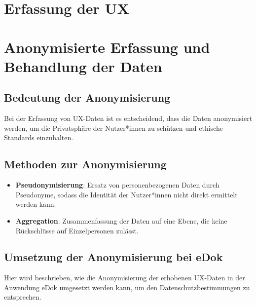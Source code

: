 \documentclass[a4paper,12pt]{report}
\begin{document}
\chapter{Erfassung der UX}
 




 

 
\chapter{Anonymisierte Erfassung und Behandlung der Daten}
\section{Bedeutung der Anonymisierung}
Bei der Erfassung von UX-Daten ist es entscheidend, dass die Daten anonymisiert werden, um die Privatsphäre der Nutzer*innen zu schützen und ethische Standards einzuhalten.
\section{Methoden zur Anonymisierung}
\begin{itemize}
    \item \textbf{Pseudonymisierung}: Ersatz von personenbezogenen Daten durch Pseudonyme, sodass die Identität der Nutzer*innen nicht direkt ermittelt werden kann.
    \item \textbf{Aggregation}: Zusammenfassung der Daten auf eine Ebene, die keine Rückschlüsse auf Einzelpersonen zulässt.
\end{itemize}
\section{Umsetzung der Anonymisierung bei eDok}
Hier wird beschrieben, wie die Anonymisierung der erhobenen UX-Daten in der Anwendung eDok umgesetzt werden kann, um den Datenschutzbestimmungen zu entsprechen.
\end{document}
